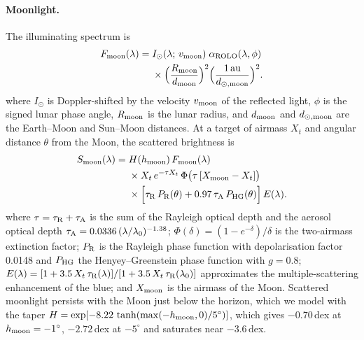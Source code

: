 \paragraph{Moonlight.} The illuminating spectrum is
\begin{equation}
\begin{split}
  F_{\rm moon}(\lambda) = {}&I_\odot(\lambda;\,v_{\rm moon})\;
  \alpha_{\rm ROLO}(\lambda,\phi)\\
  &\times\Big(\frac{R_{\rm moon}}{d_{\rm moon}}\Big)^{2}
  \Big(\frac{1\,{\rm au}}{d_{\odot,\rm moon}}\Big)^{2}.
\end{split}
\end{equation}
where $I_\odot$ is Doppler-shifted by the velocity $v_{\rm moon}$ of the
reflected light, $\phi$ is the signed lunar phase angle, $R_{\rm moon}$ is
the lunar radius, and $d_{\rm moon}$ and $d_{\odot,\rm moon}$ are the
Earth--Moon and Sun--Moon distances. At a target of airmass $X_t$ and angular
distance $\theta$ from the Moon, the scattered brightness is
\begin{equation}
\begin{split}
  S_{\rm moon}(\lambda) = {}&H(h_{\rm moon})\,F_{\rm moon}(\lambda)\\
  &\times X_t\,e^{-\tau X_t}\,\Phi\big(\tau\,[X_{\rm moon}-X_t]\big)\\
  &\times\Big[\tau_{\rm R}\,P_{\rm R}(\theta) +
  0.97\,\tau_{\rm A}\,P_{\rm HG}(\theta)\Big]\,E(\lambda).
\end{split}
\end{equation}
where $\tau = \tau_{\rm R}+\tau_{\rm A}$ is the sum of the Rayleigh optical
depth and the aerosol optical depth
$\tau_{\rm A} = 0.0336\,(\lambda/\lambda_0)^{-1.38}$;
$\Phi(\delta) = (1-e^{-\delta})/\delta$ is the two-airmass extinction factor;
$P_{\rm R}$ is the Rayleigh phase function with depolarisation factor 0.0148
and $P_{\rm HG}$ the Henyey--Greenstein phase function \citep{Henyey1941}
with $g = 0.8$; $E(\lambda) = [1+3.5\,X_t\,\tau_{\rm R}(\lambda)]/
[1+3.5\,X_t\,\tau_{\rm R}(\lambda_0)]$ approximates the multiple-scattering
enhancement of the blue; and $X_{\rm moon}$ is the airmass of the Moon.
Scattered moonlight persists with the Moon just below the horizon, which we
model with the taper $H = \exp[-8.22\,\tanh(\max(-h_{\rm moon},0)/5^\circ)]$,
which gives $-0.70$\,dex at $h_{\rm moon} = -1^\circ$, $-2.72$\,dex at
$-5^\circ$ and saturates near $-3.6$\,dex.

